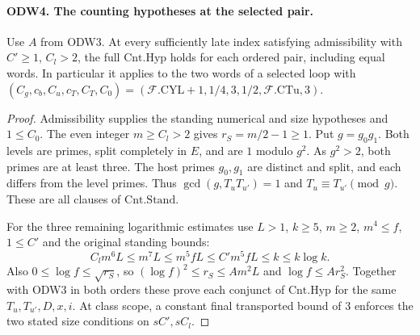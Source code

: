 \paragraph{ODW4. The counting hypotheses at the selected pair.}
\label{claim:ODW4}
Use $A$ from ODW3. At every sufficiently late index satisfying
admissibility with $C'\ge1$, $C_l>2$, the full
$\mathrm{Cnt.Hyp}$ holds for each ordered pair, including equal
words. In particular it applies to the two words of a selected
loop with $(C_g,c_b,C_u,c_T,C_T,C_0)=
(\mathcal F.\mathrm{CYL}+1,1/4,3,1/2,\mathcal F.\mathrm{CTu},3)$.
\begin{proof}
Admissibility supplies the standing numerical and size hypotheses
and $1\le C_0$. The even integer $m\ge C_l>2$ gives
$r_S=m/2-1\ge1$. Put $g=g_0g_1$. Both levels are primes,
split completely in $E$, and are $1$ modulo $g^2$. As $g^2>2$,
both primes are at least three. The host primes $g_0,g_1$ are
distinct and split, and each differs from the level primes. Thus
$\gcd(g,T_uT_{u'})=1$ and $T_u\equiv T_{u'}\pmod g$.
These are all clauses of $\mathrm{Cnt.Stand}$.

For the three remaining logarithmic estimates use $L>1$, $k\ge5$,
$m\ge2$, $m^4\le f$, $1\le C'$ and the original standing bounds:
\[
 C_lm^6L\le m^7L\le m^5fL\le C'm^5fL
       \le k\le k\log k .
\]
Also $0\le\log f\le\sqrt{r_S}$, so
$(\log f)^2\le r_S\le A m^2 L$ and $\log f\le A r_S^2$.
Together with ODW3 in both orders these prove each conjunct of
$\mathrm{Cnt.Hyp}$ for the same $T_u,T_{u'},D,x,i$. At class
scope, a constant final transported bound of $3$ enforces the two
stated size conditions on $sC',sC_l$.
\end{proof}

